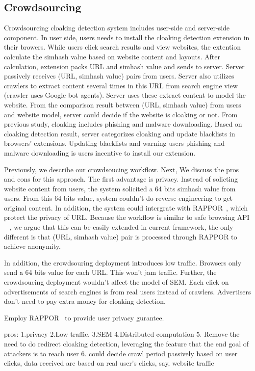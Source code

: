 \subsection{Crowdsourcing}
Crowdsourcing cloaking detection system includes user-side and server-side component. In user side, users needs to install the cloaking
detection extension in their browers. While users click search results and view websites, the extention calculate the simhash value based on 
website content and layouts. After calculation, extension packs URL and simhash value and sends to server. Server passively receives (URL, simhash value)
pairs from users. Server also utilizes crawlers to extract content several times in this URL from search engine view (crawler uses Google bot agents).
Server uses these extract content to model the website. From the comparison result between (URL, simhash value) from users and website model,
server could decide if the website is cloaking or not. From previous study, cloaking includes phishing and malware downloading. Based on cloaking
detection result, server categorizes cloaking and update blacklists in browsers' extensions. Updating blacklists and warning users phishing and
malware downloading is users incentive to install our extension.

Previously, we describe our crowdsoucing workflow. Next, We discuss the pros and cons for this approach. The first advantage is privacy. Instead of solicting
website content from users, the system solicited a 64 bits simhash value from users. From this 64 bits value, system couldn't do reverse engineering to
get original content. In addition, the system could intergrate with RAPPOR~\cite{erlingsson2014rappor}, which protect the privacy of URL.
Because the workflow is similar to safe browsing API ~\cite{rajab2013camp} , we argue that this can be easily
extended in current framework, the only different is that (URL, simhash value)
pair is processed through RAPPOR to achieve anonymity.

In addition, the crowdsouring deployment introduces low traffic. Browsers only send a 64 bits value for
each URL. This won't jam traffic. Further, the crowdsoucing deployment wouldn't affect the model of SEM. Each click on advertisements of search engines is
from real users instead of crawlers. Advertisers don't need to pay extra money for cloaking detection. 


Employ RAPPOR~\cite{erlingsson2014rappor} to provide user privacy gurantee.

pros: 	1.privacy 2.Low traffic. 3.SEM 4.Distributed computation 
5. Remove the need to do redirect cloaking detection, leveraging the feature
that the end goal of attackers is to reach user
6. could decide crawl period passively based on user clicks, data received are
based on real user’s clicks, say, website traffic
%


